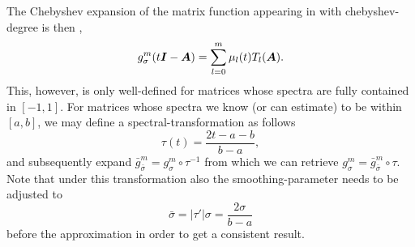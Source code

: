 The Chebyshev expansion of the matrix function appearing in 
with \gls{chebyshev-degree} is then \cite[Chapter~3]{trefethen2019chebyshev},
\begin{equation}
    g_{\sigma}^m(t\boldsymbol{I} - \boldsymbol{A}) = \sum_{l=0}^m \mu_l(t) T_l(\boldsymbol{A}).
    \label{equ:2-chebyshev-chebyshev-expansion}
\end{equation}
This, however, is only well-defined for matrices whose spectra are fully
contained in $[-1, 1]$. For matrices whose spectra we know (or can estimate) to
be within $[a, b]$, we may define a \gls{spectral-transformation} as follows
\begin{equation}
    \tau(t) = \frac{2t - a - b}{b - a},
    \label{equ:2-chebyshev-spectral-transformation}
\end{equation}
and subsequently expand $\bar{g}_{\bar{\sigma}}^m = g_{\sigma}^m \circ \tau^{-1}$ 
from which we can retrieve $g_{\sigma}^m = \bar{g}_{\bar{\sigma}}^m \circ \tau$.
Note that under this transformation also the \gls{smoothing-parameter} needs to be
adjusted to
\begin{equation}
    \bar{\sigma} = |\tau'| \sigma = \frac{2\sigma}{b - a}
    \label{equ:2-chebyshev-sigma-transformation}
\end{equation}
before the approximation in order to get a consistent result.\\

